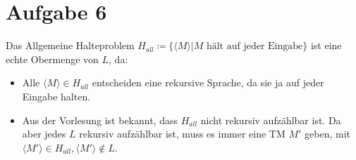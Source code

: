 \documentclass[a4paper,11pt]{scrartcl}
\begin{document}
	
	\section*{Aufgabe 6}
	Das Allgemeine Halteproblem $H_{all} \coloneqq \{\langle M \rangle \vert M \text{ hält auf jeder Eingabe}\}$ ist eine echte Obermenge von $L$, da:
	\begin{itemize}
	\item Alle $\langle M \rangle \in H_{all}$ entscheiden eine rekursive Sprache, da sie ja auf jeder Eingabe halten.
	\item Aus der Vorlesung ist bekannt, dass $H_{all}$ nicht rekursiv aufzählbar ist. Da aber jedes $L$ rekursiv aufzählbar ist, muss es immer eine TM $M'$ geben, mit $\langle M' \rangle \in H_{all}, \langle M' \rangle \not\in L$.
	\end{itemize}
	
\end{document}
